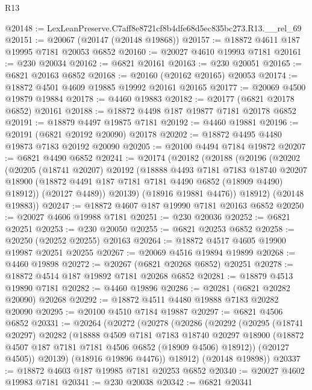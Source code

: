 \begin{lexlean}{R13}
\begin{coremodule}
@20148 := LexLeanPreserve.C7aff8e8721cf8b4dfe68d5ec835bc273.R13.__rel_69
@20151 := @20067 (@20147 (@20148 @19868))
@20157 := @18872 @4611 @187 @19995 @7181 @20053 @6852
@20160 := @20027 @4610 @19993 @7181
@20161 := @230 @20034
@20162 := @6821 @20161
@20163 := @230 @20051
@20165 := @6821 @20163 @6852
@20168 := @20160 (@20162 @20165) @20053
@20174 := @18872 @4501 @4609 @19885 @19992 @20161 @20165
@20177 := @20069 @4500 @19879 @19884
@20178 := @4460 @19883
@20182 := @20177 (@6821 @20178 @6852) @20161
@20188 := @18872 @4498 @187 @19877 @7181 @20178 @6852
@20191 := @18879 @4497 @19875 @7181
@20192 := @4460 @19881
@20196 := @20191 (@6821 @20192 @20090) @20178
@20202 := @18872 @4495 @4480 @19873 @7183 @20192 @20090
@20205 := @20100 @4494 @7184 @19872
@20207 := @6821 @4490 @6852
@20241 := @20174
    (@20182
      (@20188
        (@20196
          (@20202
            (@20205
              (@18741 @20207)
              @20192
              (@18888
                @4493
                @7181
                @7183
                @18740
                @20207
                @18900
                (@18872 @4491 @187 @7181 @7181 @4490 @6852 (@18909 @4490) @18912))
              (@20127 @4489))
            @20139)
          (@18916 @19881 @4476))
        @18912)
      (@20148 @19883))
@20247 := @18872 @4607 @187 @19990 @7181 @20163 @6852
@20250 := @20027 @4606 @19988 @7181
@20251 := @230 @20036
@20252 := @6821 @20251
@20253 := @230 @20050
@20255 := @6821 @20253 @6852
@20258 := @20250 (@20252 @20255) @20163
@20264 := @18872 @4517 @4605 @19900 @19987 @20251 @20255
@20267 := @20069 @4516 @19894 @19899
@20268 := @4460 @19898
@20272 := @20267 (@6821 @20268 @6852) @20251
@20278 := @18872 @4514 @187 @19892 @7181 @20268 @6852
@20281 := @18879 @4513 @19890 @7181
@20282 := @4460 @19896
@20286 := @20281 (@6821 @20282 @20090) @20268
@20292 := @18872 @4511 @4480 @19888 @7183 @20282 @20090
@20295 := @20100 @4510 @7184 @19887
@20297 := @6821 @4506 @6852
@20331 := @20264
    (@20272
      (@20278
        (@20286
          (@20292
            (@20295
              (@18741 @20297)
              @20282
              (@18888
                @4509
                @7181
                @7183
                @18740
                @20297
                @18900
                (@18872 @4507 @187 @7181 @7181 @4506 @6852 (@18909 @4506) @18912))
              (@20127 @4505))
            @20139)
          (@18916 @19896 @4476))
        @18912)
      (@20148 @19898))
@20337 := @18872 @4603 @187 @19985 @7181 @20253 @6852
@20340 := @20027 @4602 @19983 @7181
@20341 := @230 @20038
@20342 := @6821 @20341

\end{coremodule}
\end{lexlean}
